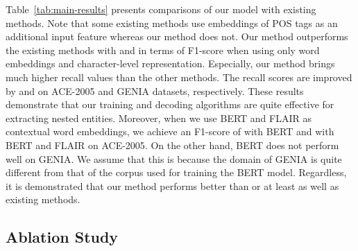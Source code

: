 \documentclass[11pt,a4paper]{article}
\def\tabref#1{Table~\ref{#1}}
\begin{document}
\tabref{tab:main-results} presents comparisons of our model with existing methods.
Note that some existing methods use embeddings of POS tags as an additional input feature whereas our method does not.
Our method outperforms the existing methods with  and  in terms of F1-score when using only word embeddings and character-level representation.
Especially, our method brings much higher recall values than the other methods.
The recall scores are improved by  and  on ACE-2005 and GENIA datasets, respectively.
These results demonstrate that our training and decoding algorithms are quite effective for extracting nested entities.
Moreover, when we use BERT and FLAIR as contextual word embeddings, we achieve an F1-score of  with BERT and  with BERT and FLAIR on ACE-2005.
On the other hand, BERT does not perform well on GENIA.
We assume that this is because the domain of GENIA is quite different from that of the corpus used for training the BERT model.
Regardless, it is demonstrated that our method performs better than or at least as well as existing methods.

\addtocounter{footnote}{-2}

\subsection{Ablation Study}
\label{ssec:ablation}

\begin{table*}[t!]
\centering
\small
{}
\caption{Results when ablating away the learning (L) and decoding (D) components of our proposed method.}\label{tab:ablation}
\end{table*}
\end{document}
